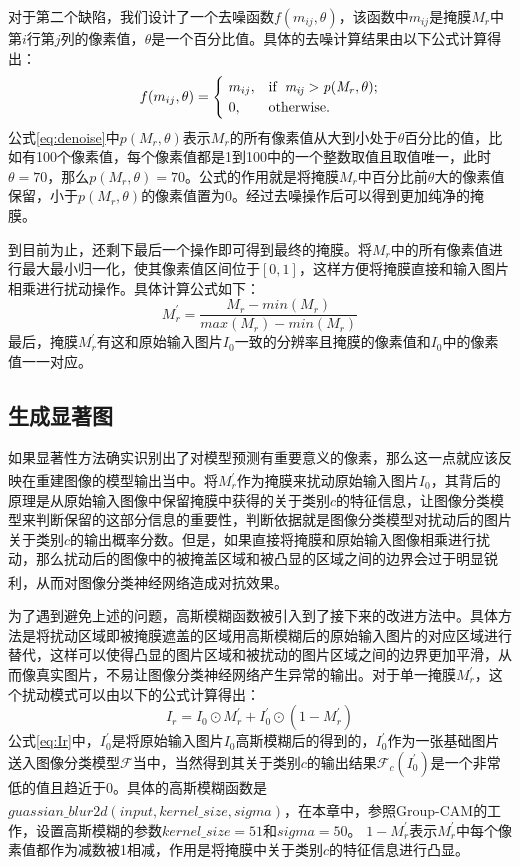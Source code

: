 对于第二个缺陷，我们设计了一个去噪函数$f(m_{ij},\theta)$，该函数中$m_{ij}$是掩膜$M_r$中第$i$行第$j$列的像素值，$\theta$是一个百分比值。具体的去噪计算结果由以下公式计算得出：
\begin{equation}
	f(m_{ij},\theta)= \begin{cases}
		\ m_{ij}, & \rm if \enspace \it m_{ij}>p(M_r,\theta) ; \\
		\ 0, & \rm otherwise .\\
	\end{cases}
	\label{eq:denoise}
\end{equation}
公式\ref{eq:denoise}中$p(M_r,\theta)$表示$M_r$的所有像素值从大到小处于$\theta$百分比的值，比如有100个像素值，每个像素值都是1到100中的一个整数取值且取值唯一，此时$\theta =70$，那么$p(M_r,\theta)=70$。公式的作用就是将掩膜$M_r$中百分比前$\theta$大的像素值保留，小于$p(M_r,\theta)$的像素值置为0。经过去噪操作后可以得到更加纯净的掩膜。

到目前为止，还剩下最后一个操作即可得到最终的掩膜。将$M_r$中的所有像素值进行最大最小归一化，使其像素值区间位于$[0,1]$，这样方便将掩膜直接和输入图片相乘进行扰动操作。具体计算公式如下：
\begin{equation}
	M^{\prime}_r=\frac{M_r-min(M_r)}{max(M_r)-min(M_r)}\label{e_minmax}
\end{equation}
最后，掩膜$M^{\prime}_r$有这和原始输入图片$I_0$一致的分辨率且掩膜的像素值和$I_0$中的像素值一一对应。

\subsection{生成显著图}
如果显著性方法确实识别出了对模型预测有重要意义的像素，那么这一点就应该反映在重建图像的模型输出当中\textsuperscript{\cite{kapishnikov2019xrai}}。将$M^{\prime}_r$作为掩膜来扰动原始输入图片$I_0$，其背后的原理是从原始输入图像中保留掩膜中获得的关于类别$c$的特征信息，让图像分类模型来判断保留的这部分信息的重要性，判断依据就是图像分类模型对扰动后的图片关于类别$c$的输出概率分数。但是，如果直接将掩膜和原始输入图像相乘进行扰动，那么扰动后的图像中的被掩盖区域和被凸显的区域之间的边界会过于明显锐利，从而对图像分类神经网络造成对抗效果\textsuperscript{\cite{dabkowski2017real}}。

为了遇到避免上述的问题，高斯模糊函数被引入到了接下来的改进方法中。具体方法是将扰动区域即被掩膜遮盖的区域用高斯模糊后的原始输入图片的对应区域进行替代，这样可以使得凸显的图片区域和被扰动的图片区域之间的边界更加平滑，从而像真实图片，不易让图像分类神经网络产生异常的输出。对于单一掩膜$M^{\prime}_r$，这个扰动模式可以由以下的公式计算得出：
\begin{equation}
	I_r=I_0\odot M^{\prime}_r+I^{\prime}_0\odot (1-M^{\prime}_r)
	\label{eq:Ir}
\end{equation}
公式\ref{eq:Ir}中，$I^{\prime}_0$是将原始输入图片$I_0$高斯模糊后的得到的，$I^{\prime}_0$作为一张基础图片送入图像分类模型$\mathcal{F}$当中，当然得到其关于类别$c$的输出结果$\mathcal{F}_c(I^{\prime}_0)$是一个非常低的值且趋近于0。具体的高斯模糊函数是$guassian\_blur2d(input,kernel\_size,sigma)$，在本章中，参照Group-CAM\textsuperscript{\cite{zhang2021novel}}的工作，设置高斯模糊的参数$kernel\_size=51$和$sigma=50$。 $1-M^{\prime}_r$表示$M^{\prime}_r$中每个像素值都作为减数被1相减，作用是将掩膜中关于类别$c$的特征信息进行凸显。

